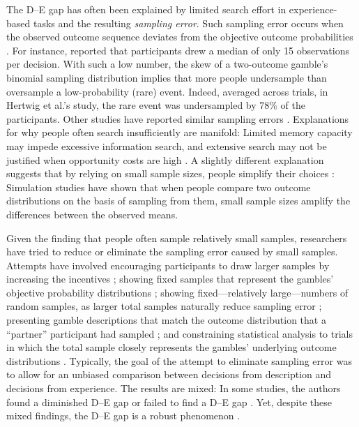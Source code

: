 \documentclass[a4paper, man, natbib, floatsintext]{apa6} %
\begin{document}
The D--E gap has often been explained by limited search effort in experience-based tasks and the resulting \textit{sampling error}. Such sampling error occurs when the observed outcome sequence deviates from the objective outcome probabilities \citep{Hadar2009}. For instance, \cite{Hertwig2004} reported that participants drew a median of only 15 observations per decision. With such a low number, the skew of a two-outcome gamble's binomial sampling distribution implies that more people undersample than oversample a low-probability (rare) event. Indeed, averaged across trials, in Hertwig et al.'s study, the rare event was undersampled by $78\%$ of the participants. Other studies have reported similar sampling errors \citep[e.g.,][]{Hau2008,Rakow2008}. Explanations for why people often search insufficiently are manifold: Limited memory capacity may impede excessive information search, and extensive search may not be justified when opportunity costs are high \citep{Hau2008}. A slightly different explanation suggests that by relying on small sample sizes, people simplify their choices \citep{Hertwig2010}: Simulation studies have shown that when people compare two outcome distributions on the basis of sampling from them, small sample sizes amplify the differences between the observed means.

Given the finding that people often sample relatively small samples, researchers have tried to reduce or eliminate the sampling error caused by small samples. Attempts have involved encouraging participants to draw larger samples by increasing the incentives \citep{Hau2008}; showing fixed samples that represent the gambles' objective probability distributions \citep{Ungemach2009}; showing fixed---relatively large---numbers of random samples, as larger total samples naturally reduce sampling error \citep{Hau2008,Hau2010}; presenting gamble descriptions that match the outcome distribution that a ``partner'' participant had sampled \citep{Rakow2008}; and constraining statistical analysis to trials in which the total sample closely represents the gambles' underlying outcome distributions \citep[e.g.,][]{Camilleri2009, Camilleri2011a}. Typically, the goal of the attempt to eliminate sampling error was to allow for an unbiased comparison between decisions from description and decisions from experience. The results are mixed: In some studies, the authors found a diminished D--E gap \citep{Hau2008,Hau2010, Ungemach2009} or failed to find a D--E gap \citep{Gloeckner2012, Camilleri2009,Camilleri2011a,Rakow2008}. Yet, despite these mixed findings, the D--E gap is a robust phenomenon \citep[for a recent meta-analysis, see][]{Wulff2017}.
\end{document}
